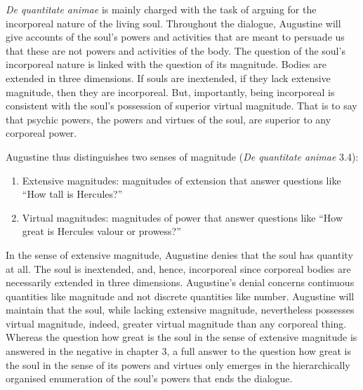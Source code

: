 \documentclass[12pt]{article}
\begin{document}

\emph{De quantitate animae}  is mainly charged with the task of arguing for the incorporeal nature of the living soul. Throughout the dialogue, Augustine will give accounts of the soul’s powers and activities that are meant to persuade us that these are not powers and activities of the body. The question of the soul’s incorporeal nature is linked with the question of its magnitude. Bodies are extended in three dimensions. If souls are inextended, if they lack extensive magnitude, then they are incorporeal. But, importantly, being incorporeal is consistent with the soul’s possession of superior virtual magnitude. That is to say that psychic powers, the powers and virtues of the soul, are superior to any corporeal power. 

Augustine thus distinguishes two senses of magnitude (\emph{De quantitate animae} 3.4):
\begin{enumerate}
	\item Extensive magnitudes: magnitudes of extension that answer questions like “How tall is Hercules?”
	\item Virtual magnitudes: magnitudes of power that answer questions like “How great is Hercules valour or prowess?”
\end{enumerate}
In the sense of extensive magnitude, Augustine denies that the soul has quantity at all. The soul is inextended, and, hence, incorporeal since corporeal bodies are necessarily extended in three dimensions. Augustine's denial concerns continuous quantities like magnitude and not discrete quantities like number. Augustine will maintain that the soul, while lacking extensive magnitude, nevertheless possesses virtual magnitude, indeed, greater virtual magnitude than any corporeal thing. Whereas the question how great is the soul in the sense of extensive magnitude is answered in the negative in chapter 3, a full answer to the question how great is the soul in the sense of its powers and virtues only emerges in the hierarchically organised enumeration of the soul’s powers that ends the dialogue. 
\end{document}
